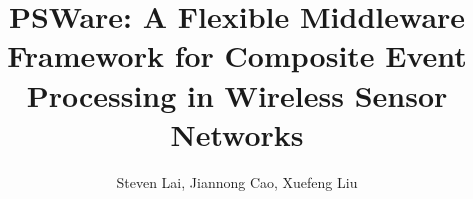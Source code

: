 \title{PSWare: A Flexible Middleware Framework for Composite Event Processing in Wireless Sensor Networks}
\author{Steven Lai, Jiannong Cao, Xuefeng Liu
}
